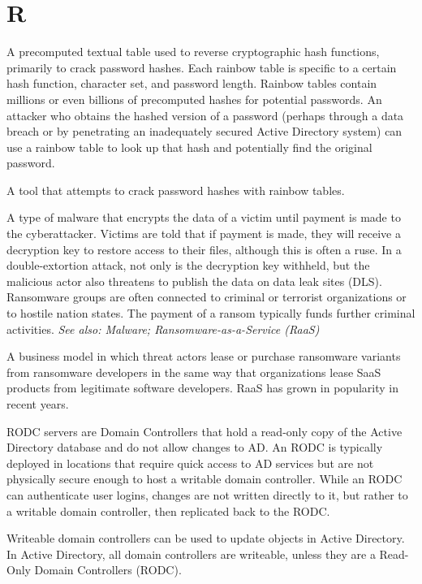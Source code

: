 \section*{R}
 A precomputed textual table used to reverse cryptographic hash functions, primarily to crack password hashes. Each rainbow table is specific to a certain hash function, character set, and password length. Rainbow tables contain millions or even billions of precomputed hashes for potential passwords. An attacker who obtains the hashed version of a password (perhaps through a data breach or by penetrating an inadequately secured Active Directory system) can use a rainbow table to look up that hash and potentially find the original password.

 A tool that attempts to crack password hashes with rainbow tables.

 A type of malware that encrypts the data of a victim until payment is made to the cyberattacker. Victims are told that if payment is made, they will receive a decryption key to restore access to their files, although this is often a ruse. In a double-extortion attack, not only is the decryption key withheld, but the malicious actor also threatens to publish the data on data leak sites (DLS). Ransomware groups are often connected to criminal or terrorist organizations or to hostile nation states. The payment of a ransom typically funds further criminal activities.
\textit{See also: Malware; Ransomware-as-a-Service (RaaS)}

 A business model in which threat actors lease or purchase ransomware variants from ransomware developers in the same way that organizations lease SaaS products from legitimate software developers. RaaS has grown in popularity in recent years.

 RODC servers are Domain Controllers that hold a read-only copy of the Active Directory database and do not allow changes to AD. An RODC is typically deployed in locations that require quick access to AD services but are not physically secure enough to host a writable domain controller. While an RODC can authenticate user logins, changes are not written directly to it, but rather to a writable domain controller, then replicated back to the RODC.

 Writeable domain controllers can be used to update objects in Active Directory. In Active Directory, all domain controllers are writeable, unless they are a Read-Only Domain Controllers (RODC).

